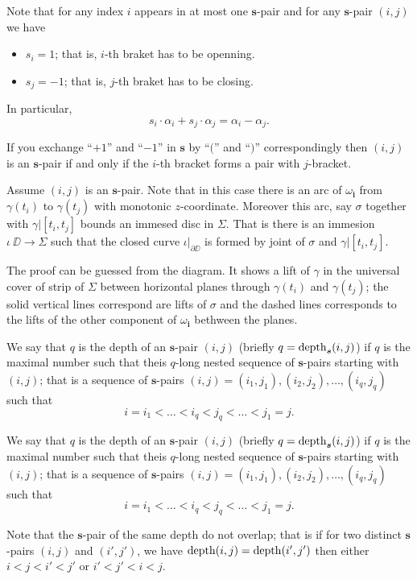 \documentclass[a4paper,10pt]{amsart}
\begin{document}
Note that for any index $i$ appears in at most one $\bm{s}$-pair and 
for any $\bm{s}$-pair $(i,j)$ we have
\begin{itemize}
\item $s_i=1$; that is, $i$-th braket has to be openning.
 \item $s_j=-1$; that is, $j$-th braket has to be closing.
\end{itemize}
In particular,
\[s_i\cdot\alpha_i+s_j\cdot\alpha_j=\alpha_i-\alpha_j.\]

If you exchange ``$+1$'' and ``$-1$'' in $\bm{s}$ by ``$($'' and ``$)$'' correspondingly then $(i,j)$ is an $\bm{s}$-pair
if and only if the $i$-th bracket forms a pair with $j$-bracket.

Assume $(i,j)$ is an $\bm{s}$-pair.
Note that in this case there is an arc of $\omega_{\bm{i}}$
from $\gamma(t_i)$ to $\gamma(t_j)$
with monotonic $z$-coordinate.
Moreover this arc, say $\sigma$ together with $\gamma|{[t_i,t_j]}$ bounds an immesed disc in $\Sigma$.
That is there is an immesion $\iota\:\DD\to\Sigma$ 
such that the closed curve $\iota|_{\partial \DD}$ is formed by joint of $\sigma$ and $\gamma|{[t_i,t_j]}$.

The proof can be guessed from the diagram.
It shows a lift of $\gamma$ in the universal cover of strip of $\Sigma$ between horizontal planes through $\gamma(t_i)$ and $\gamma(t_j)$;
the solid vertical lines correspond are lifts of $\sigma$ and the dashed lines corresponds to the lifts of the other component of $\omega_{\bm{i}}$ bethween the planes.

We say that $q$ is the depth of an $\bm{s}$-pair $(i,j)$
(briefly $q=\mathop{\rm depth}\nolimits_{\bm{s}}(i,j)$) 
if $q$ is the maximal number such that theis $q$-long nested sequence of $\bm{s}$-pairs starting with $(i,j)$; 
that is a sequence of $\bm{s}$-pairs
$(i,j)=(i_1,j_1),(i_2,j_2),\dots,(i_q,j_q)$ such that
\[i=i_1<\dots<i_q<j_q<\dots<j_1=j.\]

We say that $q$ is the depth of an $\bm{s}$-pair $(i,j)$
(briefly $q=\mathop{\rm depth}\nolimits_{\bm{s}}(i,j)$) 
if $q$ is the maximal number such that theis $q$-long nested sequence of $\bm{s}$-pairs starting with $(i,j)$; 
that is a sequence of $\bm{s}$-pairs
$(i,j)=(i_1,j_1),(i_2,j_2),\dots,(i_q,j_q)$ such that
\[i=i_1<\dots<i_q<j_q<\dots<j_1=j.\]

Note that the $\bm{s}$-pair of the same depth do not overlap;
that is if for two distinct $\bm{s}$-pairs $(i,j)$ and $(i',j')$,
we have $\mathop{\rm depth}\nolimits(i,j)=\mathop{\rm depth}\nolimits(i',j')$
then either $i<j<i'<j'$ or $i'<j'<i<j$.
\end{document}
